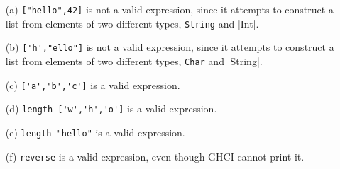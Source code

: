 
\begin{itemize}
    \item[(a)] \verb|["hello",42]| is not a valid expression, since it
    attempts to construct a list from elements of two different types,
    \verb|String| and |Int|.
    \item[(b)] \verb|['h',"ello"]| is not a valid expression, since it
    attempts to construct a list from elements of two different types,
    \verb|Char| and |String|.
    \item[(c)] \verb|['a','b','c']| is a valid expression.
    \item[(d)] \verb|length ['w','h','o']| is a valid expression.
    \item[(e)] \verb|length "hello"| is a valid expression.
    \item[(f)] \verb|reverse| is a valid expression, even though GHCI cannot
    print it.
\end{itemize}
